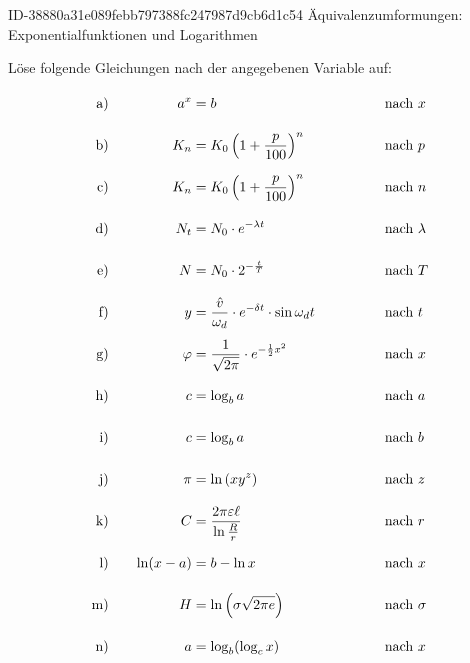 \begin{exercise}
      {ID-38880a31e089febb797388fc247987d9cb6d1c54}
      {Äquivalenzumformungen: Exponentialfunktionen und Logarithmen}
  \ifproblem\problem\par
    \newcommand{\exnum}[1]{\text{\rule[-2.5ex]{0pt}{6ex}#1}}
    Löse folgende Gleichungen nach der angegebenen Variable auf:
    \allowdisplaybreaks
    \begin{alignat*}{4}
      \exnum{a)}&\quad &    a^{x}&=b                                                                 & \quad&\quad & \quad&\text{nach $x$}       \\
      \exnum{b)}&\quad &    K_{n}&=K_{0}\left(1+\frac{p}{100}\right)^{n}                             & \quad&\quad & \quad&\text{nach $p$}       \\
      \exnum{c)}&\quad &    K_{n}&=K_{0}\left(1+\frac{p}{100}\right)^{n}                             & \quad&\quad & \quad&\text{nach $n$}       \\
      \exnum{d)}&\quad &    N_{t}&=N_{0}\cdot e^{-\lambda t}                                         & \quad&\quad & \quad&\text{nach $\lambda$} \\
      \exnum{e)}&\quad &        N&=N_{0}\cdot2^{-\frac{t}{T}}                                        & \quad&\quad & \quad&\text{nach $T$}       \\
      \exnum{f)}&\quad &        y&=\frac{\hat{v}}{\omega_{d}}\cdot e^{-\delta t}\cdot\sin\omega_{d}t & \quad&\quad & \quad&\text{nach $t$}       \\
      \exnum{g)}&\quad &  \varphi&=\frac{1}{\sqrt{2\pi}}\cdot e^{-\frac{1}{2}x^{2}}                  & \quad&\quad & \quad&\text{nach $x$}       \\
      \exnum{h)}&\quad &        c&=\log_{b}a                                                         & \quad&\quad & \quad&\text{nach $a$}       \\
      \exnum{i)}&\quad &        c&=\log_{b}a                                                         & \quad&\quad & \quad&\text{nach $b$}       \\
      \exnum{j)}&\quad &      \pi&=\ln\left(xy^{z}\right)                                            & \quad&\quad & \quad&\text{nach $z$}       \\
      \exnum{k)}&\quad &        C&=\frac{2\pi\varepsilon\ell}{\ln\frac{R}{r}}                        & \quad&\quad & \quad&\text{nach $r$}       \\
      \exnum{l)}&\quad & \ln(x-a)&=b-\ln x                                                           & \quad&\quad & \quad&\text{nach $x$}       \\
      \exnum{m)}&\quad &        H&=\ln\left(\sigma\sqrt{2\pi e}\right)                               & \quad&\quad & \quad&\text{nach $\sigma$}  \\
      \exnum{n)}&\quad &        a&=\log_{b}(\log_{c}x)                                               & \quad&\quad & \quad&\text{nach $x$}
    \end{alignat*}
  \fi
\end{exercise}
